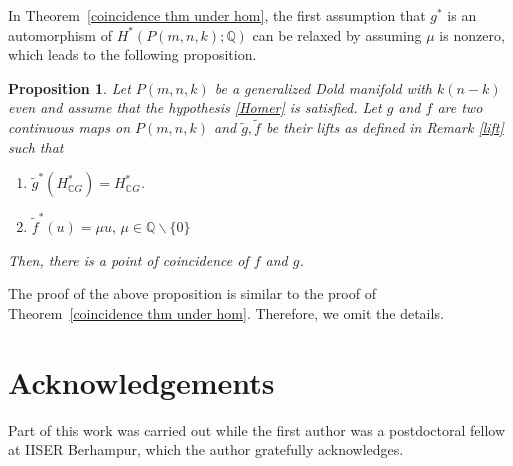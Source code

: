 \documentclass{amsart}
\newtheorem{proposition}[theorem]{Proposition}
\newcommand{\thmref}[1]{Theorem~\ref{#1}}
\begin{document}
In \thmref{coincidence thm under hom}, the first assumption that $g^*$ is an automorphism of $H^*(P(m,n,k); \mathbb{Q})$ can be relaxed by assuming $\mu$ is nonzero, which leads to the following proposition. 
\begin{proposition}
	Let $P(m,n,k)$ be a generalized Dold manifold with $k(n-k)$ even and assume that the hypothesis \eqref{Homer} is satisfied. Let $g$ and $f$ are two continuous maps on $P(m,n,k)$ and $\tilde g, \tilde f$ be their lifts as defined in  Remark \ref{lift} such that
	\begin{enumerate}
		\item $\tilde g^*(H^*_{\mathbb CG})= H^*_{\mathbb CG}$.
		\item $\tilde f^*(u)=\mu u,\, \mu\in \mathbb Q\backslash \{0\}$
	\end{enumerate}
Then, there is a point of coincidence of $f$ and  $g$.
\end{proposition}
The proof of the above proposition is similar to the proof of \thmref{coincidence thm under hom}. Therefore, we omit the details.

\section*{Acknowledgements}
Part of this work was carried out while the first author was a postdoctoral fellow at IISER Berhampur, which the author gratefully acknowledges.
\end{document}
